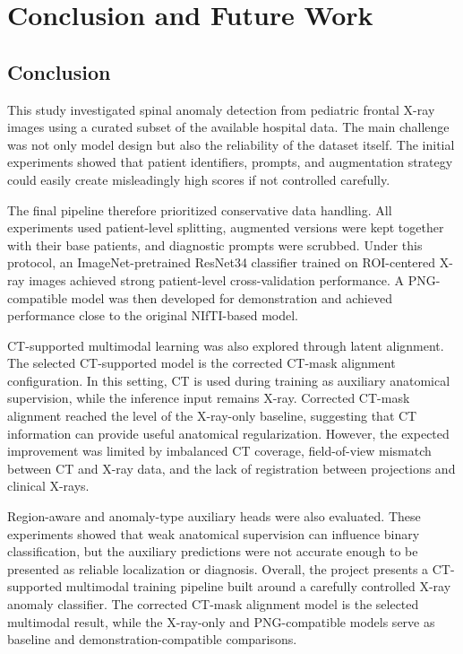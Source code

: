 \chapter{Conclusion and Future Work}
\label{ch:conclusion}

\section{Conclusion}
This study investigated spinal anomaly detection from pediatric frontal X-ray images using a curated subset of the available hospital data. The main challenge was not only model design but also the reliability of the dataset itself. The initial experiments showed that patient identifiers, prompts, and augmentation strategy could easily create misleadingly high scores if not controlled carefully.

The final pipeline therefore prioritized conservative data handling. All experiments used patient-level splitting, augmented versions were kept together with their base patients, and diagnostic prompts were scrubbed. Under this protocol, an ImageNet-pretrained ResNet34 classifier trained on ROI-centered X-ray images achieved strong patient-level cross-validation performance. A PNG-compatible model was then developed for demonstration and achieved performance close to the original NIfTI-based model.

CT-supported multimodal learning was also explored through latent alignment. The selected CT-supported model is the corrected CT-mask alignment configuration. In this setting, CT is used during training as auxiliary anatomical supervision, while the inference input remains X-ray. Corrected CT-mask alignment reached the level of the X-ray-only baseline, suggesting that CT information can provide useful anatomical regularization. However, the expected improvement was limited by imbalanced CT coverage, field-of-view mismatch between CT and X-ray data, and the lack of registration between projections and clinical X-rays.

Region-aware and anomaly-type auxiliary heads were also evaluated. These experiments showed that weak anatomical supervision can influence binary classification, but the auxiliary predictions were not accurate enough to be presented as reliable localization or diagnosis. Overall, the project presents a CT-supported multimodal training pipeline built around a carefully controlled X-ray anomaly classifier. The corrected CT-mask alignment model is the selected multimodal result, while the X-ray-only and PNG-compatible models serve as baseline and demonstration-compatible comparisons.

